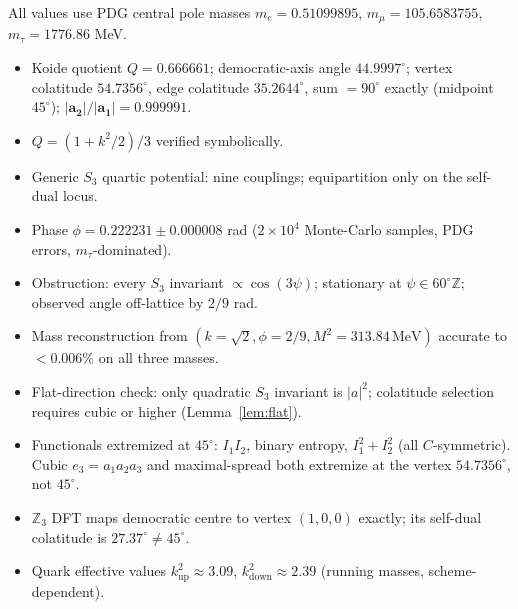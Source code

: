 \documentclass[12pt]{article}
\theoremstyle{definition}
\theoremstyle{remark}
\begin{document}
All values use PDG central pole masses $m_e=0.51099895$,
$m_\mu=105.6583755$, $m_\tau=1776.86$ MeV.
\begin{itemize}
\item Koide quotient $Q=0.666661$; democratic-axis angle $44.9997^\circ$; vertex colatitude $54.7356^\circ$, edge colatitude $35.2644^\circ$, sum $=90^\circ$ exactly (midpoint $45^\circ$);
$|\boldsymbol a_{\mathbf 2}|/|\boldsymbol a_{\mathbf 1}|=0.999991$.
\item $Q=(1+k^2/2)/3$ verified symbolically.
\item Generic $S_3$ quartic potential: nine couplings; equipartition only on
the self-dual locus.
\item Phase $\phi=0.222231\pm0.000008$ rad ($2\times10^4$ Monte-Carlo samples,
PDG errors, $m_\tau$-dominated).
\item Obstruction: every $S_3$ invariant $\propto\cos(3\psi)$; stationary at
$\psi\in60^\circ\mathbb{Z}$; observed angle off-lattice by $2/9$ rad.
\item Mass reconstruction from $(k=\sqrt2,\phi=2/9,M^2=313.84\,\mathrm{MeV})$
accurate to $<0.006\%$ on all three masses.
\item Flat-direction check: only quadratic $S_3$ invariant is $|a|^2$; colatitude selection requires cubic or higher (Lemma~\ref{lem:flat}).
\item Functionals extremized at $45^\circ$: $I_1 I_2$, binary entropy, $I_1^2+I_2^2$ (all $C$-symmetric). Cubic $e_3=a_1a_2a_3$ and maximal-spread both extremize at the vertex $54.7356^\circ$, not $45^\circ$.
\item $\mathbb{Z}_3$ DFT maps democratic centre to vertex $(1,0,0)$ exactly; its self-dual colatitude is $27.37^\circ\neq45^\circ$.
\item Quark effective values $k^2_{\mathrm{up}}\approx3.09$,
$k^2_{\mathrm{down}}\approx2.39$ (running masses, scheme-dependent).
\end{itemize}
\end{document}
